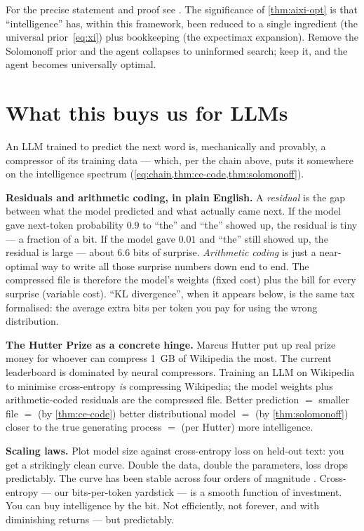 \documentclass[12pt,a4paper]{article}
\theoremstyle{plain}
\theoremstyle{definition}
\begin{document}
For the precise statement and proof see
\citet[Ch.~5]{hutter2005universal}.  The significance of
\cref{thm:aixi-opt} is that ``intelligence'' has, within this
framework, been reduced to a single ingredient (the universal
prior~\eqref{eq:xi}) plus bookkeeping (the expectimax expansion).
Remove the Solomonoff prior and the agent collapses to uninformed
search; keep it, and the agent becomes universally optimal.

\section{What this buys us for LLMs}
\label{sec:llms}

\begin{intuition}
An LLM trained to predict the next word is, mechanically and provably,
a compressor of its training data --- which, per the chain above,
puts it somewhere on the intelligence spectrum
(\cref{eq:chain,thm:ce-code,thm:solomonoff}).

\textbf{Residuals and arithmetic coding, in plain English.}  A
\emph{residual} is the gap between what the model predicted and what
actually came next.  If the model gave next-token probability $0.9$
to ``the'' and ``the'' showed up, the residual is tiny --- a fraction
of a bit.  If the model gave $0.01$ and ``the'' still showed up, the
residual is large --- about $6.6$ bits of surprise.
\emph{Arithmetic coding} is just a near-optimal way to write all
those surprise numbers down end to end.  The compressed file is
therefore the model's weights (fixed cost) plus the bill for every
surprise (variable cost).  ``KL divergence'', when it appears below,
is the same tax formalised: the average extra bits per token you pay
for using the wrong distribution.

\textbf{The Hutter Prize as a concrete hinge.}  Marcus Hutter put up
real prize money for whoever can compress 1~GB of Wikipedia the most.
The current leaderboard is dominated by neural compressors.  Training
an LLM on Wikipedia to minimise cross-entropy \emph{is} compressing
Wikipedia; the model weights plus arithmetic-coded residuals are the
compressed file.  Better prediction $=$ smaller file $=$ (by
\cref{thm:ce-code}) better distributional model $=$ (by
\cref{thm:solomonoff}) closer to the true generating process $=$
(per Hutter) more intelligence.

\textbf{Scaling laws.}  Plot model size against cross-entropy loss on
held-out text: you get a strikingly clean curve.  Double the data,
double the parameters, loss drops predictably.  The curve has been
stable across four orders of magnitude
\citep{kaplan2020scaling}.  Cross-entropy --- our bits-per-token
yardstick --- is a smooth function of investment.  You can buy
intelligence by the bit.  Not efficiently, not forever, and with
diminishing returns --- but predictably.


\end{intuition}
\end{document}
